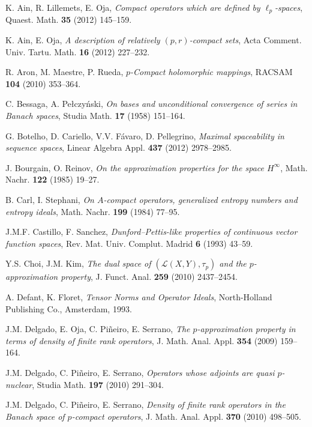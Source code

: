 \documentclass[a4paper,11pt]{amsart}
\theoremstyle{definition}
\theoremstyle{definition}
\theoremstyle{definition}
\begin{document}
\bigskip

\begin{thebibliography}{DFJP}


 K. Ain, R. Lillemets, E. Oja, {\em Compact operators which are defined by $\ell_p$-spaces}, Quaest. Math. {\bf 35} (2012) 145--159.

 K. Ain, E. Oja, {\em A description of relatively $(p,r)$-compact sets}, Acta Comment. Univ. Tartu. Math. {\bf 16} (2012)  227--232.

 R. Aron, M. Maestre, P. Rueda, {\em $p$-Compact holomorphic mappings}, RACSAM {\bf 104} (2010) 353--364.

 C. Bessaga, A. Pe{\l}czy{\'n}ski, {\em On bases and unconditional convergence of series in {B}anach spaces}, Studia Math. {\bf 17} (1958) 151--164.

 G. Botelho, D. Cariello, V.V. F{\'a}varo, D. Pellegrino, {\em Maximal spaceability in sequence spaces}, Linear Algebra Appl. {\bf 437} (2012) 2978--2985.

 J. Bourgain, O. Reinov, {\em On the approximation properties for the space $H^\infty$}, Math. Nachr. {\bf 122} (1985) 19--27.

 B. Carl, I. Stephani, {\em On $A$-compact operators, generalized entropy numbers and entropy ideals}, Math. Nachr. {\bf 199} (1984) 77--95.

 J.M.F. Castillo, F. Sanchez, {\em Dunford--{P}ettis-like properties of continuous vector function spaces}, Rev. Mat. Univ. Complut. Madrid {\bf 6} (1993) 43--59.

 Y.S. Choi, J.M. Kim, {\em The dual space of $({{\mathcal L}}(X,Y ), \tau_p)$ and the $p$-approximation property}, J. Funct. Anal. {\bf 259} (2010) 2437--2454.

 A. Defant, K. Floret, {\em Tensor Norms and Operator Ideals}, North-Holland Publishing Co., Amsterdam, 1993.

 J.M. Delgado, E. Oja, C. Pi\~{n}eiro, E. Serrano, {\em The $p$-approximation property in terms of density of finite rank operators}, J. Math. Anal. Appl. {\bf 354} (2009) 159--164.

 J.M. Delgado, C. Pi\~{n}eiro, E. Serrano, {\em Operators whose adjoints are quasi $p$-nuclear}, Studia Math. {\bf 197} (2010) 291--304.

 J.M. Delgado, C. Pi\~{n}eiro, E. Serrano, {\em Density of finite rank operators in the Banach space of $p$-compact operators}, J. Math. Anal. Appl. {\bf 370} (2010) 498--505.


\end{thebibliography}
\end{document}
